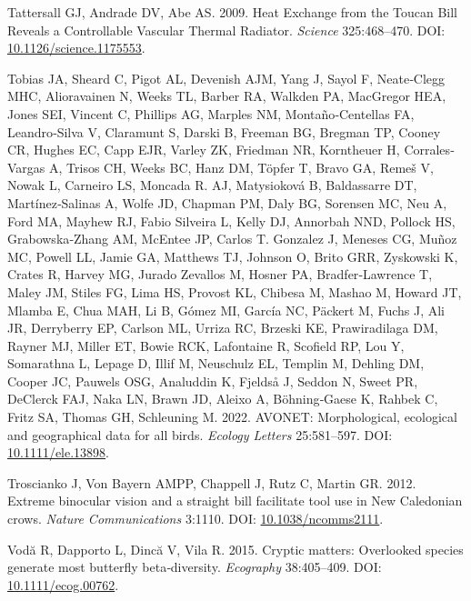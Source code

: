 \documentclass[10pt,a4paper]{article}
\newlength{\cslhangindent}
\newenvironment{CSLReferences}[2] %
 {\begin{list}{}{%
  \setlength{\itemindent}{0pt}
  \setlength{\leftmargin}{0pt}
  \setlength{\parsep}{0pt}
  \ifodd #1
   \setlength{\leftmargin}{\cslhangindent}
   \setlength{\itemindent}{-1\cslhangindent}
  \fi
  \setlength{\itemsep}{#2\baselineskip}}}
 {\end{list}}
\begin{document}
\begin{CSLReferences}{1}{0}
Tattersall GJ, Andrade DV, Abe AS. 2009. Heat {Exchange} from the {Toucan} {Bill} {Reveals} a {Controllable} {Vascular} {Thermal} {Radiator}. \emph{Science} 325:468--470. DOI: \href{https://doi.org/10.1126/science.1175553}{10.1126/science.1175553}.

Tobias JA, Sheard C, Pigot AL, Devenish AJM, Yang J, Sayol F, Neate‐Clegg MHC, Alioravainen N, Weeks TL, Barber RA, Walkden PA, MacGregor HEA, Jones SEI, Vincent C, Phillips AG, Marples NM, Montaño‐Centellas FA, Leandro‐Silva V, Claramunt S, Darski B, Freeman BG, Bregman TP, Cooney CR, Hughes EC, Capp EJR, Varley ZK, Friedman NR, Korntheuer H, Corrales‐Vargas A, Trisos CH, Weeks BC, Hanz DM, Töpfer T, Bravo GA, Remeš V, Nowak L, Carneiro LS, Moncada R. AJ, Matysioková B, Baldassarre DT, Martínez‐Salinas A, Wolfe JD, Chapman PM, Daly BG, Sorensen MC, Neu A, Ford MA, Mayhew RJ, Fabio Silveira L, Kelly DJ, Annorbah NND, Pollock HS, Grabowska‐Zhang AM, McEntee JP, Carlos T. Gonzalez J, Meneses CG, Muñoz MC, Powell LL, Jamie GA, Matthews TJ, Johnson O, Brito GRR, Zyskowski K, Crates R, Harvey MG, Jurado Zevallos M, Hosner PA, Bradfer‐Lawrence T, Maley JM, Stiles FG, Lima HS, Provost KL, Chibesa M, Mashao M, Howard JT, Mlamba E, Chua MAH, Li B, Gómez MI, García NC, Päckert M, Fuchs J, Ali JR, Derryberry EP, Carlson ML, Urriza RC, Brzeski KE, Prawiradilaga DM, Rayner MJ, Miller ET, Bowie RCK, Lafontaine R, Scofield RP, Lou Y, Somarathna L, Lepage D, Illif M, Neuschulz EL, Templin M, Dehling DM, Cooper JC, Pauwels OSG, Analuddin K, Fjeldså J, Seddon N, Sweet PR, DeClerck FAJ, Naka LN, Brawn JD, Aleixo A, Böhning‐Gaese K, Rahbek C, Fritz SA, Thomas GH, Schleuning M. 2022. {AVONET}: Morphological, ecological and geographical data for all birds. \emph{Ecology Letters} 25:581--597. DOI: \href{https://doi.org/10.1111/ele.13898}{10.1111/ele.13898}.

Troscianko J, Von Bayern AMPP, Chappell J, Rutz C, Martin GR. 2012. Extreme binocular vision and a straight bill facilitate tool use in {New} {Caledonian} crows. \emph{Nature Communications} 3:1110. DOI: \href{https://doi.org/10.1038/ncomms2111}{10.1038/ncomms2111}.

Vodă R, Dapporto L, Dincă V, Vila R. 2015. Cryptic matters: Overlooked species generate most butterfly beta‐diversity. \emph{Ecography} 38:405--409. DOI: \href{https://doi.org/10.1111/ecog.00762}{10.1111/ecog.00762}.


\end{CSLReferences}
\end{document}
